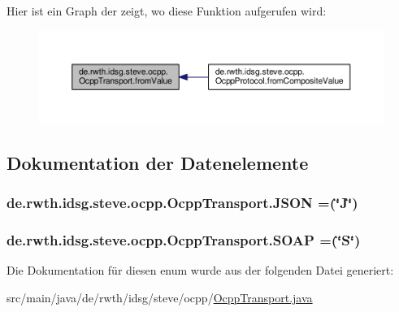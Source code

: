 Hier ist ein Graph der zeigt, wo diese Funktion aufgerufen wird\+:\nopagebreak
\begin{figure}[H]
\begin{center}
\leavevmode
\includegraphics[width=350pt]{enumde_1_1rwth_1_1idsg_1_1steve_1_1ocpp_1_1_ocpp_transport_a64ec586d12d40966424ce811f697b852_icgraph}
\end{center}
\end{figure}




\subsection{Dokumentation der Datenelemente}
\hypertarget{enumde_1_1rwth_1_1idsg_1_1steve_1_1ocpp_1_1_ocpp_transport_aa9ac4184d327d7868285a13790f45cdc}{
\subsubsection[{J\+S\+O\+N}]{\setlength{\rightskip}{0pt plus 5cm}de.\+rwth.\+idsg.\+steve.\+ocpp.\+Ocpp\+Transport.\+J\+S\+O\+N =(\char`\"{}J\char`\"{})}}\label{enumde_1_1rwth_1_1idsg_1_1steve_1_1ocpp_1_1_ocpp_transport_aa9ac4184d327d7868285a13790f45cdc}
\hypertarget{enumde_1_1rwth_1_1idsg_1_1steve_1_1ocpp_1_1_ocpp_transport_ae1fa7bdd519c49e7c5d175538ec2eb47}{
\subsubsection[{S\+O\+A\+P}]{\setlength{\rightskip}{0pt plus 5cm}de.\+rwth.\+idsg.\+steve.\+ocpp.\+Ocpp\+Transport.\+S\+O\+A\+P =(\char`\"{}S\char`\"{})}}\label{enumde_1_1rwth_1_1idsg_1_1steve_1_1ocpp_1_1_ocpp_transport_ae1fa7bdd519c49e7c5d175538ec2eb47}


Die Dokumentation für diesen enum wurde aus der folgenden Datei generiert\+:\begin{DoxyCompactItemize}
\item 
src/main/java/de/rwth/idsg/steve/ocpp/\hyperlink{_ocpp_transport_8java}{Ocpp\+Transport.\+java}\end{DoxyCompactItemize}

